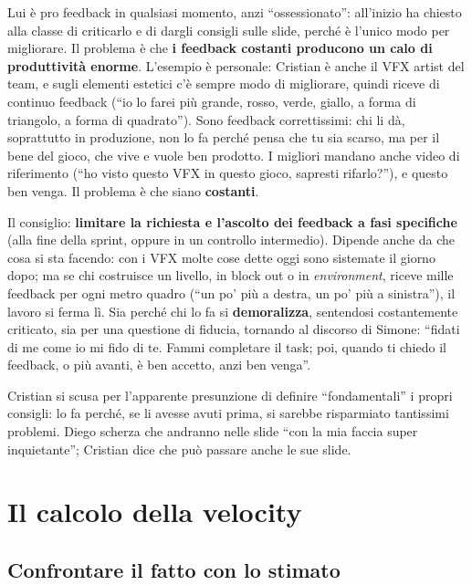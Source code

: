 Lui è pro feedback in qualsiasi momento, anzi ``ossessionato'': all'inizio ha
chiesto alla classe di criticarlo e di dargli consigli sulle slide, perché è
l'unico modo per migliorare. Il problema è che \textbf{i feedback costanti
producono un calo di produttività enorme}. L'esempio è personale: Cristian è
anche il VFX artist del team, e sugli elementi estetici c'è sempre modo di
migliorare, quindi riceve di continuo feedback (``io lo farei più grande, rosso,
verde, giallo, a forma di triangolo, a forma di quadrato''). Sono feedback
correttissimi: chi li dà, soprattutto in produzione, non lo fa perché pensa
che tu sia scarso, ma per il bene del gioco, che vive e vuole ben prodotto. I
migliori mandano anche video di riferimento (``ho visto questo VFX in questo
gioco, sapresti rifarlo?''), e questo ben venga. Il problema è che siano
\textbf{costanti}.

Il consiglio: \textbf{limitare la richiesta e l'ascolto dei feedback a fasi
specifiche} (alla fine della sprint, oppure in un controllo intermedio). Dipende
anche da che cosa si sta facendo: con i VFX molte cose dette oggi sono
sistemate il giorno dopo; ma se chi costruisce un livello, in block out o in
\emph{environment}, riceve mille feedback per ogni metro quadro (``un po' più a
destra, un po' più a sinistra''), il lavoro si ferma lì. Sia perché chi lo fa
si \textbf{demoralizza}, sentendosi costantemente criticato, sia per una
questione di fiducia, tornando al discorso di Simone: ``fidati di me come io mi
fido di te. Fammi completare il task; poi, quando ti chiedo il feedback, o più
avanti, è ben accetto, anzi ben venga''.

Cristian si scusa per l'apparente presunzione di definire ``fondamentali'' i
propri consigli: lo fa perché, se li avesse avuti prima, si sarebbe risparmiato
tantissimi problemi. Diego scherza che andranno nelle slide ``con la mia faccia
super inquietante''; Cristian dice che può passare anche le sue slide.

\section{Il calcolo della velocity}
\label{sec:z3-calcolo}

\subsection{Confrontare il fatto con lo stimato}


